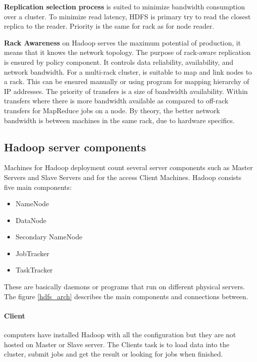 \documentclass[a4paper,12pt,oneside]{report}
\begin{document}
	\textbf{Replication selection process} is suited to minimize bandwidth
	consumption over a cluster. 
	To minimize read latency, HDFS is primary try to read the closest replica to the
	reader. Priority is the 
	same for rack as for node reader. \cite{hadoop_hdfs_web}
	
	\textbf{Rack Awareness} on Hadoop serves the maximum potential of production, 
	it means that it knows the network topology. The purpose of rack-aware
	replication is ensured by policy 
	component. It controls data reliability, availability, and network bandwidth.
	For a multi-rack cluster, is suitable to map and link
	nodes to a rack\cite{hadoop_rack_web}. This can be ensured manually or using
	program for mapping hierarchy of IP 
	addresses. The priority of transfers is a size of bandwidth availability. Within
	transfers 
	where there is more bandwidth available as compared to off-rack transfers for
	MapReduce jobs on a node. 
	By theory, the better network bandwidth is between machines in the same rack,
	due to hardware specifics.
	
	\subsection{Hadoop server components}
	Machines for Hadoop deployment count several server components such as Master
	Servers and Slave Servers and for the access Client Machines.  Hadoop consists
	five main components: 
	\begin{itemize}[noitemsep]
		\item NameNode
		\item DataNode
		\item Secondary NameNode
		\item JobTracker
		\item TaskTracker
	\end{itemize}
	These are basically daemons or programs that run on different physical servers.
	The figure \ref{hdfs_arch} describes the main components and connections
	between.
	
	\paragraph{Client}
	computers have installed Hadoop with  all the configuration but they are not
	hosted on Master or Slave 
	server. The Clients task is to  load data into the cluster, submit jobs and get
	the result or looking for jobs when finished.
	
\end{document}
